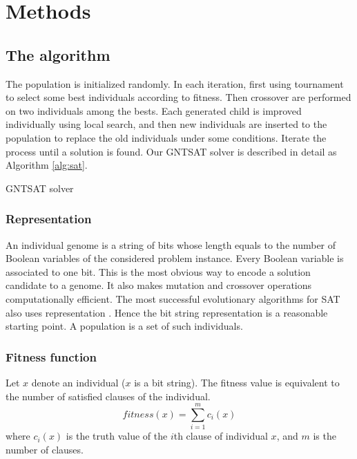 \section{Methods}
\subsection{The algorithm}
The population is initialized randomly.  In each iteration, first using
tournament to select some best individuals according to fitness. Then
crossover are performed on two individuals among the bests. Each generated
child is improved individually using local search, and then new individuals
are inserted to the population to replace the old individuals under some
conditions. Iterate the process until a solution is found. Our GNTSAT solver
is described in detail as Algorithm \ref{alg:sat}.
\begin{algorithm}
	\SetAlgoLined
	\caption{GNTSAT solver}
	\label{alg:sat}
	\BlankLine
\end{algorithm}

\subsubsection{Representation}
An individual genome is a string of bits whose length equals to the number of
Boolean variables of the considered problem instance. Every Boolean variable
is associated to one bit. This is the most obvious way to encode a solution
candidate to a genome. It also makes mutation and crossover operations
computationally efficient. The most successful evolutionary algorithms for SAT
also uses representation \parencite{gottlieb_marchiori_rossi_2002}. Hence the bit string
representation is a reasonable starting point. A population is a set of such
individuals.

\subsubsection{Fitness function}
Let $x$ denote an individual ($x$ is a
bit string). The fitness value is equivalent to the number of satisfied
clauses of the individual.
\begin{equation*}
	\mathit{fitness}(x) = \sum_{i=1}^m c_i(x)
\end{equation*}
where $c_i(x)$ is the truth value of the
$i$th clause of individual $x$, and
$m$ is the number of clauses.

